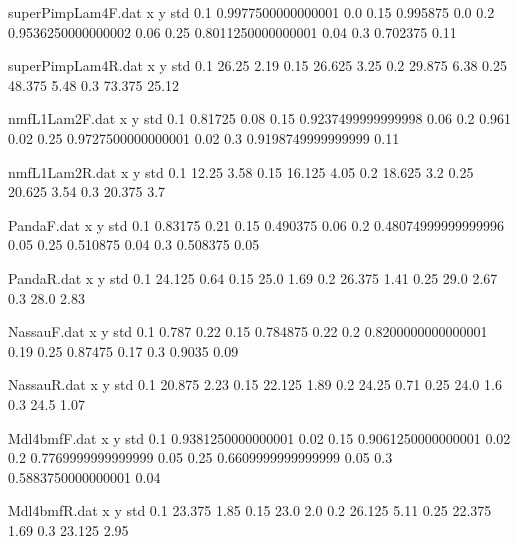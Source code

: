 \begin{filecontents}{superPimpLam4F.dat}
x y std
0.1 0.9977500000000001 0.0
0.15 0.995875 0.0
0.2 0.9536250000000002 0.06
0.25 0.8011250000000001 0.04
0.3 0.702375 0.11
\end{filecontents}
\begin{filecontents}{superPimpLam4R.dat}
x y std
0.1 26.25 2.19
0.15 26.625 3.25
0.2 29.875 6.38
0.25 48.375 5.48
0.3 73.375 25.12
\end{filecontents}
\begin{filecontents}{nmfL1Lam2F.dat}
x y std
0.1 0.81725 0.08
0.15 0.9237499999999998 0.06
0.2 0.961 0.02
0.25 0.9727500000000001 0.02
0.3 0.9198749999999999 0.11
\end{filecontents}
\begin{filecontents}{nmfL1Lam2R.dat}
x y std
0.1 12.25 3.58
0.15 16.125 4.05
0.2 18.625 3.2
0.25 20.625 3.54
0.3 20.375 3.7
\end{filecontents}
\begin{filecontents}{PandaF.dat}
x y std
0.1 0.83175 0.21
0.15 0.490375 0.06
0.2 0.48074999999999996 0.05
0.25 0.510875 0.04
0.3 0.508375 0.05
\end{filecontents}
\begin{filecontents}{PandaR.dat}
x y std
0.1 24.125 0.64
0.15 25.0 1.69
0.2 26.375 1.41
0.25 29.0 2.67
0.3 28.0 2.83
\end{filecontents}
\begin{filecontents}{NassauF.dat}
x y std
0.1 0.787 0.22
0.15 0.784875 0.22
0.2 0.8200000000000001 0.19
0.25 0.87475 0.17
0.3 0.9035 0.09
\end{filecontents}
\begin{filecontents}{NassauR.dat}
x y std
0.1 20.875 2.23
0.15 22.125 1.89
0.2 24.25 0.71
0.25 24.0 1.6
0.3 24.5 1.07
\end{filecontents}
\begin{filecontents}{Mdl4bmfF.dat}
x y std
0.1 0.9381250000000001 0.02
0.15 0.9061250000000001 0.02
0.2 0.7769999999999999 0.05
0.25 0.6609999999999999 0.05
0.3 0.5883750000000001 0.04
\end{filecontents}
\begin{filecontents}{Mdl4bmfR.dat}
x y std
0.1 23.375 1.85
0.15 23.0 2.0
0.2 26.125 5.11
0.25 22.375 1.69
0.3 23.125 2.95
\end{filecontents}